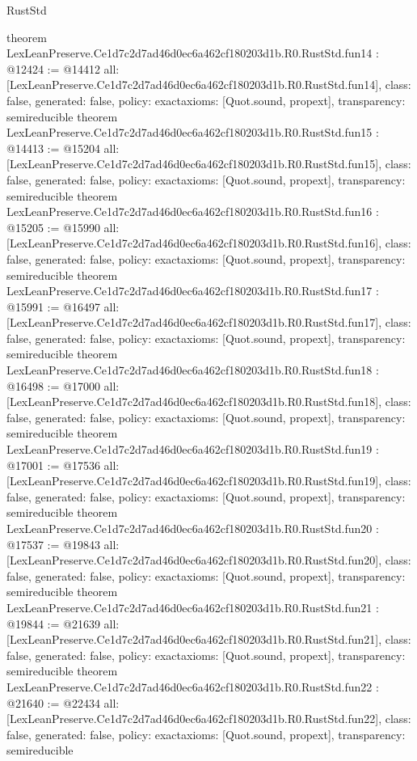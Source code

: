 \begin{lexlean}{RustStd}
\begin{coremodule}
{}
theorem LexLeanPreserve.Ce1d7c2d7ad46d0ec6a462cf180203d1b.R0.RustStd.fun14 : @12424 := @14412 {
  all: [LexLeanPreserve.Ce1d7c2d7ad46d0ec6a462cf180203d1b.R0.RustStd.fun14],
  class: false,
  generated: false,
  policy: exact{axioms: [Quot.sound, propext]},
  transparency: semireducible
}
theorem LexLeanPreserve.Ce1d7c2d7ad46d0ec6a462cf180203d1b.R0.RustStd.fun15 : @14413 := @15204 {
  all: [LexLeanPreserve.Ce1d7c2d7ad46d0ec6a462cf180203d1b.R0.RustStd.fun15],
  class: false,
  generated: false,
  policy: exact{axioms: [Quot.sound, propext]},
  transparency: semireducible
}
theorem LexLeanPreserve.Ce1d7c2d7ad46d0ec6a462cf180203d1b.R0.RustStd.fun16 : @15205 := @15990 {
  all: [LexLeanPreserve.Ce1d7c2d7ad46d0ec6a462cf180203d1b.R0.RustStd.fun16],
  class: false,
  generated: false,
  policy: exact{axioms: [Quot.sound, propext]},
  transparency: semireducible
}
theorem LexLeanPreserve.Ce1d7c2d7ad46d0ec6a462cf180203d1b.R0.RustStd.fun17 : @15991 := @16497 {
  all: [LexLeanPreserve.Ce1d7c2d7ad46d0ec6a462cf180203d1b.R0.RustStd.fun17],
  class: false,
  generated: false,
  policy: exact{axioms: [Quot.sound, propext]},
  transparency: semireducible
}
theorem LexLeanPreserve.Ce1d7c2d7ad46d0ec6a462cf180203d1b.R0.RustStd.fun18 : @16498 := @17000 {
  all: [LexLeanPreserve.Ce1d7c2d7ad46d0ec6a462cf180203d1b.R0.RustStd.fun18],
  class: false,
  generated: false,
  policy: exact{axioms: [Quot.sound, propext]},
  transparency: semireducible
}
theorem LexLeanPreserve.Ce1d7c2d7ad46d0ec6a462cf180203d1b.R0.RustStd.fun19 : @17001 := @17536 {
  all: [LexLeanPreserve.Ce1d7c2d7ad46d0ec6a462cf180203d1b.R0.RustStd.fun19],
  class: false,
  generated: false,
  policy: exact{axioms: [Quot.sound, propext]},
  transparency: semireducible
}
theorem LexLeanPreserve.Ce1d7c2d7ad46d0ec6a462cf180203d1b.R0.RustStd.fun20 : @17537 := @19843 {
  all: [LexLeanPreserve.Ce1d7c2d7ad46d0ec6a462cf180203d1b.R0.RustStd.fun20],
  class: false,
  generated: false,
  policy: exact{axioms: [Quot.sound, propext]},
  transparency: semireducible
}
theorem LexLeanPreserve.Ce1d7c2d7ad46d0ec6a462cf180203d1b.R0.RustStd.fun21 : @19844 := @21639 {
  all: [LexLeanPreserve.Ce1d7c2d7ad46d0ec6a462cf180203d1b.R0.RustStd.fun21],
  class: false,
  generated: false,
  policy: exact{axioms: [Quot.sound, propext]},
  transparency: semireducible
}
theorem LexLeanPreserve.Ce1d7c2d7ad46d0ec6a462cf180203d1b.R0.RustStd.fun22 : @21640 := @22434 {
  all: [LexLeanPreserve.Ce1d7c2d7ad46d0ec6a462cf180203d1b.R0.RustStd.fun22],
  class: false,
  generated: false,
  policy: exact{axioms: [Quot.sound, propext]},
  transparency: semireducible
}
\end{coremodule}
\end{lexlean}
